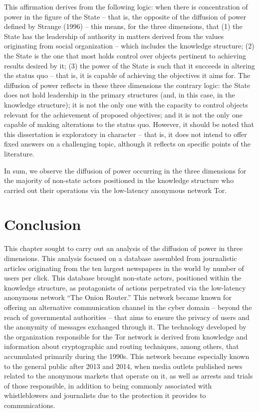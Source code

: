 This affirmation derives from the following logic: when there is concentration of power in the figure of the State -- that is, the opposite of the diffusion of power defined by Strange (1996) -- this means, for the three dimensions, that (1) the State has the leadership of authority in matters derived from the values originating from social organization -- which includes the knowledge structure; (2) the State is the one that most holds control over objects pertinent to achieving results desired by it; (3) the power of the State is such that it succeeds in altering the status quo -- that is, it is capable of achieving the objectives it aims for. The diffusion of power reflects in these three dimensions the contrary logic: the State does not hold leadership in the primary structures (and, in this case, in the knowledge structure); it is not the only one with the capacity to control objects relevant for the achievement of proposed objectives; and it is not the only one capable of making alterations to the status quo. However, it should be noted that this dissertation is exploratory in character -- that is, it does not intend to offer fixed answers on a challenging topic, although it reflects on specific points of the literature.

In sum, we observe the diffusion of power occurring in the three dimensions for the majority of non-state actors positioned in the knowledge structure who carried out their operations via the low-latency anonymous network Tor.


\section{Conclusion}

This chapter sought to carry out an analysis of the diffusion of power in three dimensions. This analysis focused on a database assembled from journalistic articles originating from the ten largest newspapers in the world by number of users per click. This database brought non-state actors, positioned within the knowledge structure, as protagonists of actions perpetrated via the low-latency anonymous network ``The Onion Router.'' This network became known for offering an alternative communication channel in the cyber domain -- beyond the reach of governmental authorities -- that aims to ensure the privacy of users and the anonymity of messages exchanged through it. The technology developed by the organization responsible for the Tor network is derived from knowledge and information about cryptographic and routing techniques, among others, that accumulated primarily during the 1990s. This network became especially known to the general public after 2013 and 2014, when media outlets published news related to the anonymous markets that operate on it, as well as arrests and trials of those responsible, in addition to being commonly associated with whistleblowers and journalists due to the protection it provides to communications.


